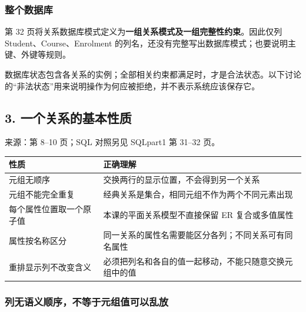 \subsubsection{整个数据库}\label{03_relational_model_and_integrity_zh-ux6574ux4e2aux6570ux636eux5e93}

第 32 页将关系数据库模式定义为\textbf{一组关系模式及一组完整性约束}。因此仅列 Student、Course、Enrolment 的列名，还没有完整写出数据库模式；也要说明主键、外键等规则。

数据库状态包含各关系的实例；全部相关约束都满足时，才是合法状态。以下讨论的``非法状态''用来说明操作为何应被拒绝，并不表示系统应该保存它。

\subsection{3. 一个关系的基本性质}\label{03_relational_model_and_integrity_zh-ux4e00ux4e2aux5173ux7cfbux7684ux57faux672cux6027ux8d28}

来源：第 8--10 页；SQL 对照另见 SQLpart1 第 31--32 页。

\begin{longtable}[]{@{}
  >{\raggedright\arraybackslash}p{}
  >{\raggedright\arraybackslash}p{}@{}}
\toprule\noalign{}
\begin{minipage}[b]{\linewidth}\raggedright
性质
\end{minipage} & \begin{minipage}[b]{\linewidth}\raggedright
正确理解
\end{minipage} \\
\midrule\noalign{}
\endhead
\bottomrule\noalign{}
\endlastfoot
元组无顺序 & 交换两行的显示位置，不会得到另一个关系 \\
元组不能完全重复 & 经典关系是集合，相同元组不作为两个不同元素出现 \\
每个属性位置取一个原子值 & 本课的平面关系模型不直接保留 ER 复合或多值属性 \\
属性按名称区分 & 同一关系的属性名需要能区分各列；不同关系可有同名属性 \\
重排显示列不改变含义 & 必须把列名和各自的值一起移动，不能只随意交换元组中的值 \\
\end{longtable}

\subsubsection{列无语义顺序，不等于元组值可以乱放}\label{03_relational_model_and_integrity_zh-ux5217ux65e0ux8bedux4e49ux987aux5e8fux4e0dux7b49ux4e8eux5143ux7ec4ux503cux53efux4ee5ux4e71ux653e}

